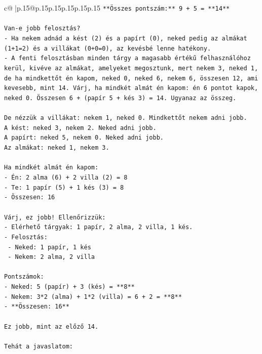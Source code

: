 \documentclass{article}
\begin{document}
{\begin{supertabular}{c@{$\;$}|p{.15\linewidth}@{}p{.15\linewidth}p{.15\linewidth}p{.15\linewidth}p{.15\linewidth}p{.15\linewidth}}
{{{\texttt{**Összes pontszám:** 9 + 5 = **14**} \\
\\ 
\texttt{Van{-}e jobb felosztás?} \\
\texttt{{-} Ha nekem adnád a kést (2) és a papírt (0), neked pedig az almákat (1+1=2) és a villákat (0+0=0), az kevésbé lenne hatékony.} \\
\texttt{{-} A fenti felosztásban minden tárgy a magasabb értékű felhasználóhoz kerül, kivéve az almákat, amelyeket megosztunk, mert nekem 3, neked 1, de ha mindkettőt én kapom, neked 0, neked 6, nekem 6, összesen 12, ami kevesebb, mint 14. Várj, ha mindkét almát én kapom: én 6 pontot kapok, neked 0. Összesen 6 + (papír 5 + kés 3) = 14. Ugyanaz az összeg.} \\
\\ 
\texttt{De nézzük a villákat: nekem 1, neked 0. Mindkettőt nekem adni jobb.} \\
\texttt{A kést: neked 3, nekem 2. Neked adni jobb.} \\
\texttt{A papírt: neked 5, nekem 0. Neked adni jobb.} \\
\texttt{Az almákat: neked 1, nekem 3.} \\
\\ 
\texttt{Ha mindkét almát én kapom:} \\
\texttt{{-} Én: 2 alma (6) + 2 villa (2) = 8} \\
\texttt{{-} Te: 1 papír (5) + 1 kés (3) = 8} \\
\texttt{{-} Összesen: 16} \\
\\ 
\texttt{Várj, ez jobb! Ellenőrizzük:} \\
\texttt{{-} Elérhető tárgyak: 1 papír, 2 alma, 2 villa, 1 kés.} \\
\texttt{{-} Felosztás:} \\
\texttt{  {-} Neked: 1 papír, 1 kés} \\
\texttt{  {-} Nekem: 2 alma, 2 villa} \\
\\ 
\texttt{Pontszámok:} \\
\texttt{{-} Neked: 5 (papír) + 3 (kés) = **8**} \\
\texttt{{-} Nekem: 3*2 (alma) + 1*2 (villa) = 6 + 2 = **8**} \\
\texttt{{-} **Összesen: 16**} \\
\\ 
\texttt{Ez jobb, mint az előző 14.} \\
\\ 
\texttt{Tehát a javaslatom:} \\
}}}
\end{supertabular}}
\end{document}
